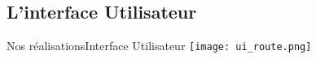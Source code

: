 \subsection{L'interface Utilisateur}

\begin{frame}{Nos réalisations}{Interface Utilisateur}
    \texttt{[image: ui\_route.png]}
\end{frame}